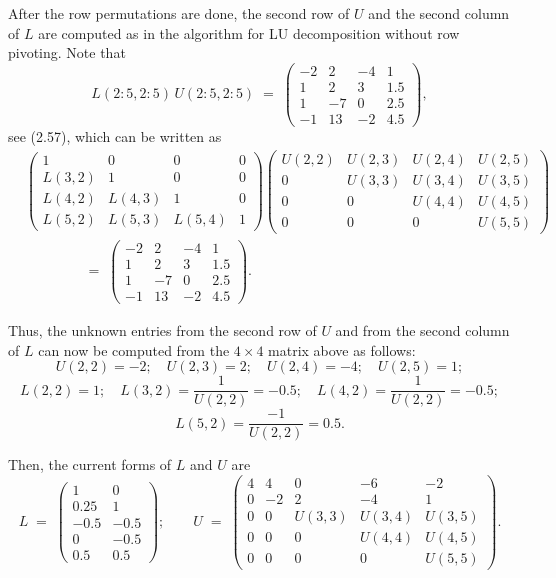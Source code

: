 After the row permutations are done, the second row of $U$ and the second
column of $L$ are computed as in the algorithm for LU decomposition without
row pivoting. Note that
\[
L(2:5,2:5)\, U(2:5,2:5) \;=\;
\begin{pmatrix} -2 & 2 & -4 & 1\\ 1 & 2 & 3 & 1.5\\ 1 & -7 & 0 & 2.5\\ -1 & 13 & -2 & 4.5 \end{pmatrix},
\]
see (2.57), which can be written as
\[
\begin{aligned}
&\begin{pmatrix}
1 & 0 & 0 & 0\\
L(3,2) & 1 & 0 & 0\\
L(4,2) & L(4,3) & 1 & 0\\
L(5,2) & L(5,3) & L(5,4) & 1
\end{pmatrix}
\begin{pmatrix}
U(2,2) & U(2,3) & U(2,4) & U(2,5)\\
0 & U(3,3) & U(3,4) & U(3,5)\\
0 & 0 & U(4,4) & U(4,5)\\
0 & 0 & 0 & U(5,5)
\end{pmatrix}\\
&\qquad\qquad\;=\;
\begin{pmatrix}
-2 & 2 & -4 & 1\\
1 & 2 & 3 & 1.5\\
1 & -7 & 0 & 2.5\\
-1 & 13 & -2 & 4.5
\end{pmatrix}.
\end{aligned}
\]

Thus, the unknown entries from the second row of $U$ and from the second
column of $L$ can now be computed from the $4\times 4$ matrix above as
follows:
\[
U(2,2)=-2;\quad U(2,3)=2;\quad U(2,4)=-4;\quad U(2,5)=1;
\]
\[
L(2,2)=1;\quad L(3,2)=\dfrac{1}{U(2,2)}=-0.5;\quad L(4,2)=\dfrac{1}{U(2,2)}=-0.5;
\]
\[
L(5,2)=\dfrac{-1}{U(2,2)}=0.5.
\]

Then, the current forms of $L$ and $U$ are
\begin{equation}
L \;=\;
\begin{pmatrix} 1 & 0\\ 0.25 & 1\\ -0.5 & -0.5\\ 0 & -0.5\\ 0.5 & 0.5 \end{pmatrix}
;\qquad
U \;=\;
\begin{pmatrix}
4 & 4 & 0 & -6 & -2\\
0 & -2 & 2 & -4 & 1\\
0 & 0 & U(3,3) & U(3,4) & U(3,5)\\
0 & 0 & 0 & U(4,4) & U(4,5)\\
0 & 0 & 0 & 0 & U(5,5)
\end{pmatrix}.
\end{equation}

